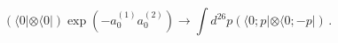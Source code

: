 \begin{equation}
\left(\langle 0 | \otimes \langle 0 |\right)
\exp\left(-a^{(1)}_0a^{(2)}_0\right) \rightarrow
\int d^{26} p
\left( \langle 0; p | \otimes \langle 0; -p | \right)\,.
\end{equation}

